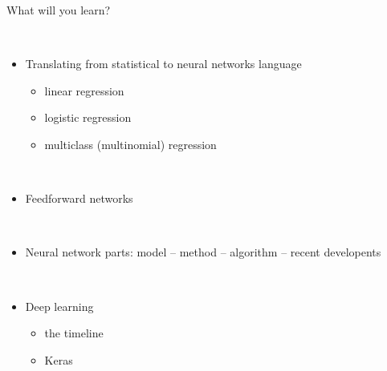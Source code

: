 \documentclass[10pt,ignorenonframetext,]{beamer}
\providecommand{\tightlist}{%
  \setlength{\itemsep}{0pt}\setlength{\parskip}{0pt}}
\begin{document}
\begin{frame}

\begin{block}{What will you learn?}

\(~\)

\begin{itemize}
\tightlist
\item
  Translating from statistical to neural networks language

  \begin{itemize}
  \tightlist
  \item
    linear regression
  \item
    logistic regression
  \item
    multiclass (multinomial) regression
  \end{itemize}
\end{itemize}

\(~\)

\begin{itemize}
\tightlist
\item
  Feedforward networks
\end{itemize}

\(~\)

\begin{itemize}
\tightlist
\item
  Neural network parts: model -- method -- algorithm -- recent
  developents
\end{itemize}

\(~\)

\begin{itemize}
\tightlist
\item
  Deep learning

  \begin{itemize}
  \tightlist
  \item
    the timeline
  \item
    Keras
  \end{itemize}
\end{itemize}

\end{block}

\end{frame}
\end{document}
